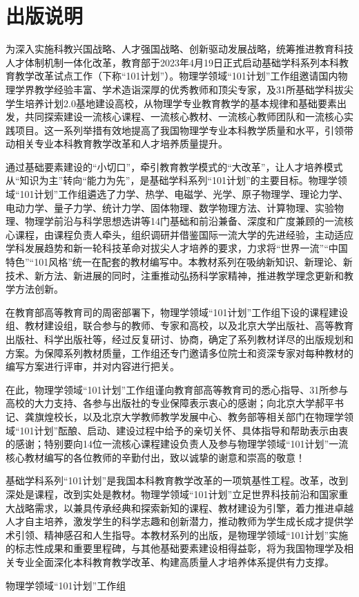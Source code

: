 \chapter*{出版说明}

为深入实施科教兴国战略、人才强国战略、创新驱动发展战略，统筹推进教育科技人才体制机制一体化改革，教育部于2023年4月19日正式启动基础学科系列本科教育教学改革试点工作（下称“101计划”）。物理学领域“101计划”工作组邀请国内物理学界教学经验丰富、学术造诣深厚的优秀教师和顶尖专家，及31所基础学科拔尖学生培养计划2.0基地建设高校，从物理学专业教育教学的基本规律和基础要素出发，共同探索建设一流核心课程、一流核心教材、一流核心教师团队和一流核心实践项目。这一系列举措有效地提高了我国物理学专业本科教学质量和水平，引领带动相关专业本科教育教学改革和人才培养质量提升。

通过基础要素建设的“小切口”，牵引教育教学模式的“大改革”，让人才培养模式从“知识为主”转向“能力为先”，是基础学科系列“101计划”的主要目标。物理学领域“101计划”工作组遴选了力学、热学、电磁学、光学、原子物理学、理论力学、电动力学、量子力学、统计力学、固体物理、数学物理方法、计算物理、实验物理、物理学前沿与科学思想选讲等14门基础和前沿兼备、深度和广度兼顾的一流核心课程，由课程负责人牵头，组织调研并借鉴国际一流大学的先进经验，主动适应学科发展趋势和新一轮科技革命对拔尖人才培养的要求，力求将“世界一流”“中国特色”“101风格”统一在配套的教材编写中。本教材系列在吸纳新知识、新理论、新技术、新方法、新进展的同时，注重推动弘扬科学家精神，推进教学理念更新和教学方法创新。

在教育部高等教育司的周密部署下，物理学领域“101计划”工作组下设的课程建设组、教材建设组，联合参与的教师、专家和高校，以及北京大学出版社、高等教育出版社、科学出版社等，经过反复研讨、协商，确定了系列教材详尽的出版规划和方案。为保障系列教材质量，工作组还专门邀请多位院士和资深专家对每种教材的编写方案进行评审，并对内容进行把关。

在此，物理学领域“101计划”工作组谨向教育部高等教育司的悉心指导、31所参与高校的大力支持、各参与出版社的专业保障表示衷心的感谢；向北京大学郝平书记、龚旗煌校长，以及北京大学教师教学发展中心、教务部等相关部门在物理学领域“101计划”酝酿、启动、建设过程中给予的亲切关怀、具体指导和帮助表示由衷的感谢；特别要向14位一流核心课程建设负责人及参与物理学领域“101计划”一流核心教材编写的各位教师的辛勤付出，致以诚挚的谢意和崇高的敬意！

基础学科系列“101计划”是我国本科教育教学改革的一项筑基性工程。改革，改到深处是课程，改到实处是教材。物理学领域“101计划”立足世界科技前沿和国家重大战略需求，以兼具传承经典和探索新知的课程、教材建设为引擎，着力推进卓越人才自主培养，激发学生的科学志趣和创新潜力，推动教师为学生成长成才提供学术引领、精神感召和人生指导。本教材系列的出版，是物理学领域“101计划”实施的标志性成果和重要里程碑，与其他基础要素建设相得益彰，将为我国物理学及相关专业全面深化本科教育教学改革、构建高质量人才培养体系提供有力支撑。

\begin{flushright}
物理学领域“101计划”工作组
\end{flushright}
\clearpage
